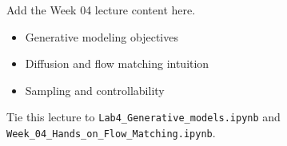 Add the Week 04 lecture content here.

\begin{itemize}
  \item Generative modeling objectives
  \item Diffusion and flow matching intuition
  \item Sampling and controllability
\end{itemize}

Tie this lecture to \texttt{Lab4\_Generative\_models.ipynb} and \texttt{Week\_04\_Hands\_on\_Flow\_Matching.ipynb}.
